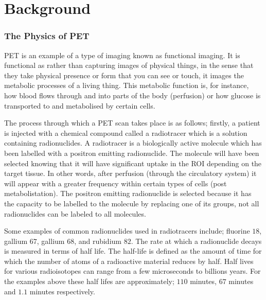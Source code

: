 \chapter{Background} \label{background}
    \blindtext
    
        \blindtext
        
        \subsection{The Physics of PET} \label{the_physics_of_pet}
            \gls{PET} is an example of a type of imaging known as functional imaging. It is functional as rather than capturing images of physical things, in the sense that they take physical presence or form that you can see or touch, it images the metabolic processes of a living thing. This metabolic function is, for instance, how blood flows through and into parts of the body (perfusion) or how glucose is transported to and metabolised by certain cells.
            
            The process through which a \gls{PET} scan takes place is as follows; firstly, a patient is injected with a chemical compound called a radiotracer which is a solution containing radionuclides. A radiotracer is a biologically active molecule which has been labelled with a positron emitting radionuclide. The molecule will have been selected knowing that it will have significant uptake in the \gls{ROI} depending on the target tissue. In other words, after perfusion (through the circulatory system) it will appear with a greater frequency within certain types of cells (post metabolistation). The positron emitting radionuclide is selected because it has the capacity to be labelled to the molecule by replacing one of its groups, not all radionuclides can be labeled to all molecules. %
            
            Some examples of common radionuclides used in radiotracers include; fluorine $18$, gallium $67$, gallium $68$, and rubidium $82$. The rate at which a radionuclide decays is measured in terms of half life. The half-life is defined as the amount of time for which the number of atoms of a radioactive material reduces by half. Half lives for various radioisotopes can range from a few microseconds to billions years. For the examples above these half lifes are approximately; $110$ minutes, $67$ minutes and $1.1$ minutes respectively.
            
